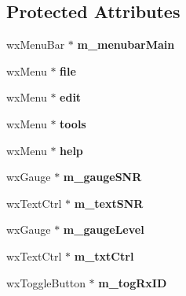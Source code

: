 \subsection*{Protected Attributes}
\begin{DoxyCompactItemize}
\item 
\hypertarget{class_top_frame_ab8388928329baa6623d0f70f070e6d19}{wx\-Menu\-Bar $\ast$ {\bfseries m\-\_\-menubar\-Main}}\label{class_top_frame_ab8388928329baa6623d0f70f070e6d19}

\item 
\hypertarget{class_top_frame_a2f719fd825ff8e4dbf04bc734429b668}{wx\-Menu $\ast$ {\bfseries file}}\label{class_top_frame_a2f719fd825ff8e4dbf04bc734429b668}

\item 
\hypertarget{class_top_frame_a60ea330aef5ff340179c5ee637d3a204}{wx\-Menu $\ast$ {\bfseries edit}}\label{class_top_frame_a60ea330aef5ff340179c5ee637d3a204}

\item 
\hypertarget{class_top_frame_a4471183520bb3cb8788cfa2e9786ea13}{wx\-Menu $\ast$ {\bfseries tools}}\label{class_top_frame_a4471183520bb3cb8788cfa2e9786ea13}

\item 
\hypertarget{class_top_frame_a2f92350d1f6b62ae32ba3eef2961db5f}{wx\-Menu $\ast$ {\bfseries help}}\label{class_top_frame_a2f92350d1f6b62ae32ba3eef2961db5f}

\item 
\hypertarget{class_top_frame_aff23d43f975a63e1bfeec89f1ef19257}{wx\-Gauge $\ast$ {\bfseries m\-\_\-gauge\-S\-N\-R}}\label{class_top_frame_aff23d43f975a63e1bfeec89f1ef19257}

\item 
\hypertarget{class_top_frame_a0e4812881b601e62d2ebf30579f9d451}{wx\-Text\-Ctrl $\ast$ {\bfseries m\-\_\-text\-S\-N\-R}}\label{class_top_frame_a0e4812881b601e62d2ebf30579f9d451}

\item 
\hypertarget{class_top_frame_a156842bf1e564d3a3bfbf8a17ae1df10}{wx\-Gauge $\ast$ {\bfseries m\-\_\-gauge\-Level}}\label{class_top_frame_a156842bf1e564d3a3bfbf8a17ae1df10}

\item 
\hypertarget{class_top_frame_a7611a87ad6897f435cae4f9f972195b1}{wx\-Text\-Ctrl $\ast$ {\bfseries m\-\_\-txt\-Ctrl}}\label{class_top_frame_a7611a87ad6897f435cae4f9f972195b1}

\item 
\hypertarget{class_top_frame_ab66518823dd4d7b1f2802676ac651cdc}{wx\-Toggle\-Button $\ast$ {\bfseries m\-\_\-tog\-Rx\-I\-D}}\label{class_top_frame_ab66518823dd4d7b1f2802676ac651cdc}


\end{DoxyCompactItemize}
